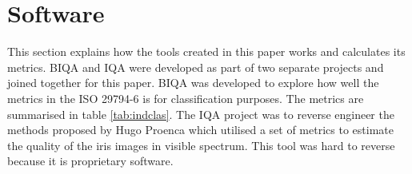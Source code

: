
\section{Software}
\label{sec:software}
This section explains how the tools created in this paper works and calculates
its metrics.
BIQA and IQA were developed as part of two separate projects and joined
together for this paper.  BIQA\cite{biqa} was developed to explore how well 
the metrics in the ISO 29794-6 \cite{iso} is for classification
purposes. The metrics are summarised in table \ref{tab:indclas}.
The IQA\cite{iqa} project was to reverse engineer the methods proposed by Hugo
Proenca\cite{hugo} which utilised a set of metrics to estimate the quality of 
the iris images in visible spectrum. This tool was hard to reverse because it is
proprietary software.




%


